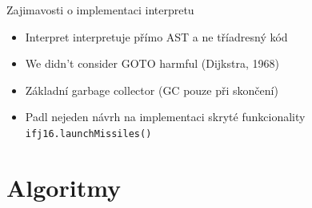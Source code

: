 \documentclass[13pt]{beamer}
\begin{document}
\begin{frame}{Zajimavosti o implementaci interpretu}
  \begin{itemize}
    \item Interpret interpretuje přímo AST a ne tříadresný kód
    \item We didn't consider GOTO harmful (Dijkstra, 1968)
    \item Základní garbage collector (GC pouze při skončení)
    \item Padl nejeden návrh na implementaci skryté funkcionality \texttt{ifj16.launchMissiles()}
  \end{itemize}
\end{frame}

\section{Algoritmy}
\end{document}
